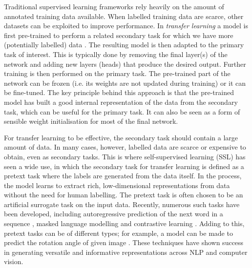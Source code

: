 \documentclass[a4paper,12pt]{article}
\begin{document}
Traditional supervised learning frameworks rely heavily on the amount of annotated training data available. When labelled training data are scarce, other datasets can be exploited to improve performance. In \emph{transfer learning} a model is first pre-trained to perform a related secondary task for which we have more (potentially labelled) data \cite{udl}. The resulting model is then adapted to the primary task of interest. This is typically done by removing the final layer(s) of the network and adding new layers (heads) that produce the desired output. Further training is then performed on the primary task. The pre-trained part of the network can be frozen (i.e. its weights are not updated during training) or it can be fine-tuned. The key principle behind this approach is that the pre-trained model has built a good internal representation of the data from the secondary task, which can be useful for the primary task. It can also be seen as a form of sensible weight initialisation for most of the final network.

For transfer learning to be effective, the secondary task should contain a large amount of data. In many cases, however, labelled data are scarce or expensive to obtain, even as secondary tasks. This is where self-supervised learning (SSL) has seen a wide use, in which the secondary task for transfer learning is defined as a  pretext task where the labels are generated from the data itself. In the process, the model learns to extract rich, low-dimensional representations from data without the need for human labelling. The pretext task is often chosen to be an artificial surrogate task on the input data. Recently, numerous such tasks have been developed, including autoregressive prediction of the next word in a sequence \cite{radford2019language}, masked language modelling \cite{devlin2018bert} and contrastive learning \cite{radford2021learning}. Adding to this, pretext tasks can be of different types; for example,  a model can be made to predict the rotation angle of given image \cite{hintonsimpleframework}. These techniques have shown success in generating versatile and informative representations across NLP and computer vision.
\end{document}

